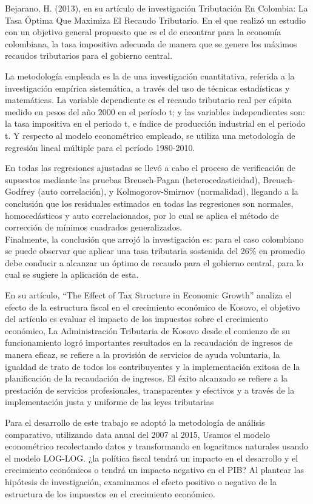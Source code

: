 \documentclass[
  letterpaper,
  DIV=11,
  numbers=noendperiod]{scrartcl}
\begin{document}
Bejarano, H. (2013), en su artículo de investigación Tributación En
Colombia: La Tasa Óptima Que Maximiza El Recaudo Tributario. En el que
realizó un estudio con un objetivo general propuesto que es el de
encontrar para la economía colombiana, la tasa impositiva adecuada de
manera que se genere los máximos recaudos tributarios para el gobierno
central.

La metodología empleada es la de una investigación cuantitativa,
referida a la investigación empírica sistemática, a través del uso de
técnicas estadísticas y matemáticas. La variable dependiente es el
recaudo tributario real per cápita medido en pesos del año 2000 en el
período t; y las variables independientes son: la tasa impositiva en el
periodo t, e índice de producción industrial en el periodo t. Y respecto
al modelo econométrico empleado, se utiliza una metodología de regresión
lineal múltiple para el período 1980-2010.

En todas las regresiones ajustadas se llevó a cabo el proceso de
verificación de supuestos mediante las pruebas Breusch-Pagan
(heterocedasticidad), Breusch-Godfrey (auto correlación), y
Kolmogorov-Smirnov (normalidad), llegando a la conclusión que los
residuales estimados en todas las regresiones son normales,
homocedásticos y auto correlacionados, por lo cual se aplica el método
de corrección de mínimos cuadrados generalizados.\\
Finalmente, la conclusión que arrojó la investigación es: para el caso
colombiano se puede observar que aplicar una tasa tributaria sostenida
del 26\% en promedio debe conducir a alcanzar un óptimo de recaudo para
el gobierno central, para lo cual se sugiere la aplicación de esta.

\textcite{gashi_effect_2018} En su artículo, ``The Effect of Tax
Structure in Economic Growth'' analiza el efecto de la estructura fiscal
en el crecimiento económico de Kosovo, el objetivo del artículo es
evaluar el impacto de los impuestos sobre el crecimiento económico, La
Administración Tributaria de Kosovo desde el comienzo de su
funcionamiento logró importantes resultados en la recaudación de
ingresos de manera eficaz, se refiere a la provisión de servicios de
ayuda voluntaria, la igualdad de trato de todos los contribuyentes y la
implementación exitosa de la planificación de la recaudación de
ingresos. El éxito alcanzado se refiere a la prestación de servicios
profesionales, transparentes y efectivos y a través de la implementación
justa y uniforme de las leyes tributarias

Para el desarrollo de este trabajo se adoptó la metodología de análisis
comparativo, utilizando data anual del 2007 al 2015, Usamos el modelo
econométrico recolectando datos y transformando en logaritmos naturales
usando el modelo LOG-LOG. ¿la política fiscal tendrá un impacto en el
desarrollo y el crecimiento económicos o tendrá un impacto negativo en
el PIB? Al plantear las hipótesis de investigación, examinamos el efecto
positivo o negativo de la estructura de los impuestos en el crecimiento
económico.
\end{document}
